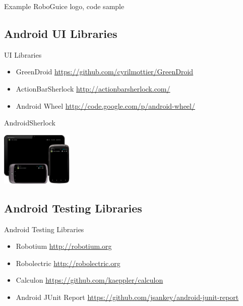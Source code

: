 \documentclass[aspectratio=169]{beamer}
\newcommand{\surl}[1] {{\tiny \url{#1}}}
\begin{document}
    \begin{frame}{Example RoboGuice}
      logo, code sample
    \end{frame}
  

  \subsection{Android UI Libraries}

    \begin{frame}{UI Libraries}
      \begin{itemize}
       \item<1-> GreenDroid \surl{https://github.com/cyrilmottier/GreenDroid}
       \item<2-> ActionBarSherlock \surl{http://actionbarsherlock.com/} 
       \item Android Wheel \surl{http://code.google.com/p/android-wheel/}
      \end{itemize}

    \end{frame}

    \begin{frame}{AndroidSherlock}
      \begin{center}
      \includegraphics[height=1.0in]{androidsherlock.png}
      \end{center}
    \end{frame}

  \subsection{Android Testing Libraries}

    \begin{frame}{Android Testing Libraries}
      \begin{itemize}
        \item<1->Robotium \surl{http://robotium.org}
        \item<2->Robolectric \surl{http://robolectric.org}
        \item<3->Calculon \surl{https://github.com/kaeppler/calculon}
        \item<4->Android JUnit Report \surl{https://github.com/jsankey/android-junit-report}
      \end{itemize}
    \end{frame}
\end{document}
